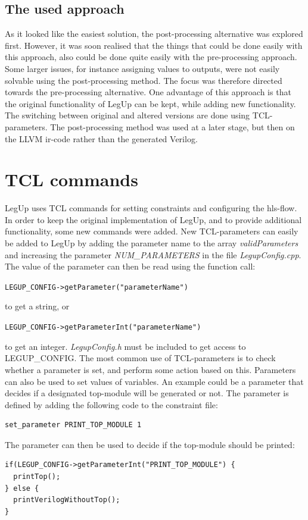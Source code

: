 \subsection{The used approach}
As it looked like the easiest solution, the post-processing alternative was explored first. However, it was soon realised that the things that could be done easily with this approach, also could be done quite easily with the pre-processing approach. Some larger issues, for instance assigning values to outputs, were not easily solvable using the post-processing method. The focus was therefore directed towards the pre-processing alternative. One advantage of this approach is that the original functionality of LegUp can be kept, while adding new functionality. The switching between original and altered versions are done using TCL-parameters. The post-processing method was used at a later stage, but then on the LLVM \gls{ir}-code rather than the generated Verilog.

\section{TCL commands}
LegUp uses TCL commands for setting constraints and configuring the \gls{hls}-flow. In order to keep the original implementation of LegUp, and to provide additional functionality, some new commands were added. New TCL-parameters can easily be added to LegUp by adding the parameter name to the array \textit{validParameters} and increasing the parameter \textit{NUM\_PARAMETERS} in the file \textit{LegupConfig.cpp}. The value of the parameter can then be read using the function call:

\verb!LEGUP_CONFIG->getParameter("parameterName")!

to get a string, or 

\verb!LEGUP_CONFIG->getParameterInt("parameterName")! 

to get an integer. \textit{LegupConfig.h} must be included to get access to LEGUP\_CONFIG. The most common use of TCL-parameters is to check whether a parameter is set, and perform some action based on this. Parameters can also be used to set values of variables. An example could be a parameter that decides if a designated top-module will be generated or not. The parameter is defined by adding the following code to the constraint file:

\begin{verbatim}
set_parameter PRINT_TOP_MODULE 1
\end{verbatim}
The parameter can then be used to decide if the top-module should be printed:
\lstset{language=C++,style=Cstyle}
\begin{lstlisting}
if(LEGUP_CONFIG->getParameterInt("PRINT_TOP_MODULE") {
  printTop();
} else {
  printVerilogWithoutTop();
}
\end{lstlisting}

